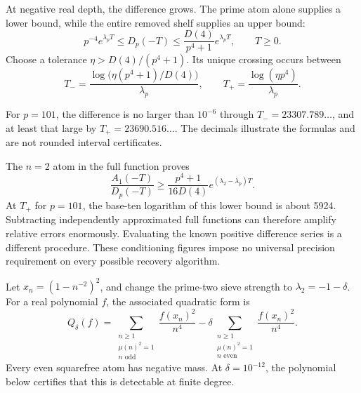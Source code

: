 At negative real depth, the difference grows. The prime atom alone supplies
a lower bound, while the entire removed shelf supplies an upper bound:
\[
p^{-4}e^{\lambda_pT}\le D_p(-T)
\le\frac{D(4)}{p^4+1}e^{\lambda_pT},\qquad T\ge0.
\]
Choose a tolerance $\eta>D(4)/(p^4+1)$. Its unique crossing occurs between
\[
T_- =\frac{\log\!\bigl(\eta(p^4+1)/D(4)\bigr)}{\lambda_p},
\qquad
T_+ =\frac{\log(\eta p^4)}{\lambda_p}.
\]


For $p=101$, the difference is no larger than $10^{-6}$ through
$T_-=23307.789\ldots$, and at least that large by
$T_+=23690.516\ldots$. The decimals illustrate the formulas and are not
rounded interval certificates.

The $n=2$ atom in the full function proves
\[
\frac{A_1(-T)}{D_p(-T)}
\ge\frac{p^4+1}{16D(4)}e^{(\lambda_2-\lambda_p)T}.
\]
At $T_+$ for $p=101$, the base-ten logarithm of this lower bound is about
5924. Subtracting independently approximated full functions can therefore
amplify relative errors enormously. Evaluating the known positive difference
series is a different procedure. These conditioning figures impose no
universal precision requirement on every possible recovery algorithm.

Let $x_n=(1-n^{-2})^2$, and change the prime-two sieve strength to
$\lambda_2=-1-\delta$. For a real polynomial $f$, the associated quadratic form is
\[
Q_\delta(f)=\sum_{\substack{n\ge1\\\mu(n)^2=1\\n\text{ odd}}}
 \frac{f(x_n)^2}{n^4}
-\delta\sum_{\substack{n\ge1\\\mu(n)^2=1\\n\text{ even}}}
 \frac{f(x_n)^2}{n^4}.
\]
Every even squarefree atom has negative mass. At $\delta=10^{-12}$,
the polynomial below certifies that this is detectable at finite degree.


